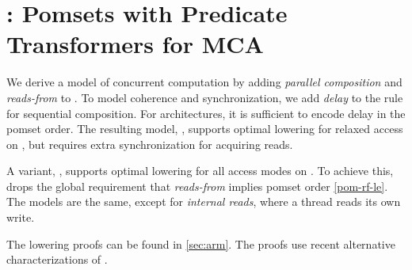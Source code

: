 \section{\PwTmcaTITLE{}: Pomsets with Predicate Transformers for MCA}
\label{sec:mca}

We derive a model of concurrent computation by adding \emph{parallel
  composition} and \emph{reads-from} to .  To model coherence
and synchronization, we add \emph{delay} to the rule for sequential
composition.  For \mca{} architectures, it is sufficient to encode delay in
the pomset order.  The resulting model, , supports optimal lowering
for relaxed access on \armeight{}, but requires extra synchronization for
acquiring reads.

A variant, , supports optimal lowering for all access modes on
\armeight{}.  To achieve this,  drops the global requirement that
\emph{reads-from} implies pomset order \eqref{pom-rf-le}.  The models are the
same, except for \emph{internal reads}, where a thread reads its own write.

The lowering proofs can be found in \textsection\ref{sec:arm}.  The proofs
use recent alternative characterizations of \armeight{} \cite{armed}.

\subsection{}
\label{sec:mca1}

